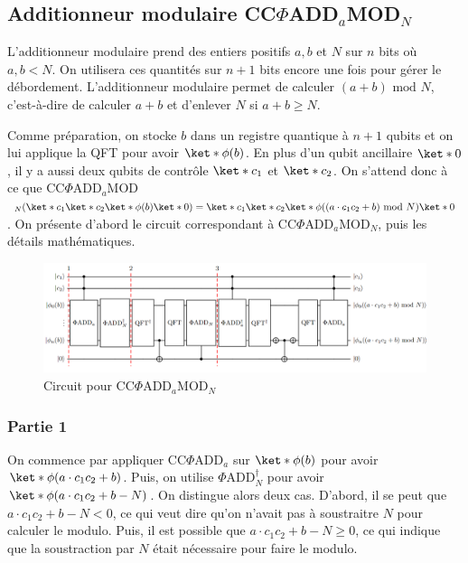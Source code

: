 \subsection{Additionneur modulaire CC$\Phi$ADD$_a$MOD$_N$}
L'additionneur modulaire prend des entiers positifs $a, b$ et $N$ sur $n$ bits où $a,b < N$. On utilisera ces quantités sur $n+1$ bits encore une fois pour gérer le débordement. L'additionneur modulaire permet de calculer $(a+b)\text{ mod } N$, c'est-à-dire de calculer $a+b$ et d'enlever $N$ si $a+b \geq N$.

 Comme préparation, on stocke $b$ dans un registre quantique à $n+1$ qubits et on lui applique la QFT pour avoir $\ket*{\phi(b)}$. En plus d'un qubit ancillaire $\ket*{0}$, il y a aussi deux qubits de contrôle $\ket*{c_1} $ et $\ket*{c_2}$. On s'attend donc à ce que  CC$\Phi$ADD$_a$MOD$_N (\ket*{c_1} \ket*{c_2} \ket*{\phi(b)} \ket*{0}) = \ket*{c_1}\ket*{c_2} \ket*{\phi((a\cdot c_1 c_2+b) \text{ mod } N)} \ket*{0}$. On présente d'abord le circuit correspondant à  CC$\Phi$ADD$_a$MOD$_N$, puis les détails mathématiques.

\begin{figure}[H]
    \centering
    \includegraphics[scale=0.55]{images/add_mod.png}
    \caption{Circuit pour CC$\Phi$ADD$_a$MOD$_N$}
\end{figure}

\subsubsection*{Partie 1}
On commence par appliquer CC$\Phi$ADD$_a$ sur $\ket*{\phi(b)}$ pour avoir $\ket*{\phi(a \cdot c_1c_2 + b)}$. Puis, on utilise $\Phi$ADD$_N^\dag$ pour avoir $\ket*{\phi(a \cdot c_1c_2 + b - N)}$. On distingue alors deux cas. D'abord, il se peut que $a \cdot c_1c_2 + b - N < 0$, ce qui veut dire qu'on n'avait pas à soustraitre $N$ pour calculer le modulo. Puis, il est possible que $a \cdot c_1c_2 + b - N \geq 0$, ce qui indique que la soustraction par $N$ était nécessaire pour faire le modulo. 


